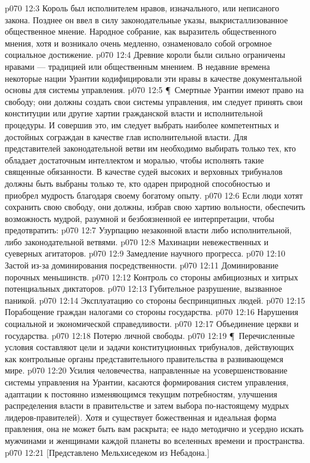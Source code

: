 \vs p070 12:3 Король был исполнителем нравов, изначального, или неписаного закона. Позднее он ввел в силу законодательные указы, выкристаллизованное общественное мнение. Народное собрание, как выразитель общественного мнения, хотя и возникало очень медленно, ознаменовало собой огромное социальное достижение.
\vs p070 12:4 Древние короли были сильно ограничены нравами --- традицией или общественным мнением. В недавние времена некоторые нации Урантии кодифицировали эти нравы в качестве документальной основы для системы управления.
\vs p070 12:5 \P\ Смертные Урантии имеют право на свободу; они должны создать свои системы управления, им следует принять свои конституции или другие хартии гражданской власти и исполнительной процедуры. И совершив это, им следует выбрать наиболее компетентных и достойных сограждан в качестве глав исполнительной власти. Для представителей законодательной ветви им необходимо выбирать только тех, кто обладает достаточным интеллектом и моралью, чтобы исполнять такие священные обязанности. В качестве судей высоких и верховных трибуналов должны быть выбраны только те, кто одарен природной способностью и приобрел мудрость благодаря своему богатому опыту.
\vs p070 12:6 Если люди хотят сохранить свою свободу, они должны, избрав свою хартию вольности, обеспечить возможность мудрой, разумной и безбоязненной ее интерпретации, чтобы предотвратить:
\vs p070 12:7 \bibnobreakspace Узурпацию незаконной власти либо исполнительной, либо законодательной ветвями.
\vs p070 12:8 \bibnobreakspace Махинации невежественных и суеверных агитаторов.
\vs p070 12:9 \bibnobreakspace Замедление научного прогресса.
\vs p070 12:10 \bibnobreakspace Застой из\hyp{}за доминирования посредственности.
\vs p070 12:11 \bibnobreakspace Доминирование порочных меньшинств.
\vs p070 12:12 \bibnobreakspace Контроль со стороны амбициозных и хитрых потенциальных диктаторов.
\vs p070 12:13 \bibnobreakspace Губительное разрушение, вызванное паникой.
\vs p070 12:14 \bibnobreakspace Эксплуатацию со стороны беспринципных людей.
\vs p070 12:15 \bibnobreakspace Порабощение граждан налогами со стороны государства.
\vs p070 12:16 \bibnobreakspace Нарушения социальной и экономической справедливости.
\vs p070 12:17 \bibnobreakspace Объединение церкви и государства.
\vs p070 12:18 \bibnobreakspace Потерю личной свободы.
\vs p070 12:19 \P\ Перечисленные условия составляют цели и задачи конституционных трибуналов, действующих как контрольные органы представительного правительства в развивающемся мире.
\vs p070 12:20 Усилия человечества, направленные на усовершенствование системы управления на Урантии, касаются формирования систем управления, адаптации к постоянно изменяющимся текущим потребностям, улучшения распределения власти в правительстве и затем выбора по\hyp{}настоящему мудрых лидеров\hyp{}правителей). Хотя и существует божественная и идеальная форма правления, она не может быть вам раскрыта; ее надо методично и усердно искать мужчинами и женщинами каждой планеты во вселенных времени и пространства.
\vs p070 12:21 [Представлено Мельхиседеком из Небадона.]
